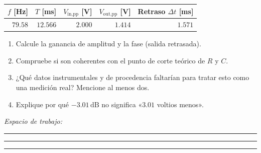 \documentclass[11pt, a4paper]{article}
\begin{document}
\vspace{0.15cm}
\begin{center}
\renewcommand{\arraystretch}{1.3}
\begin{tabular}{rrrrr}
\toprule
\textbf{$f$ [Hz]} & \textbf{$T$ [ms]} & \textbf{$V_{\text{in,pp}}$ [V]} & \textbf{$V_{\text{out,pp}}$ [V]} & \textbf{Retraso $\Delta t$ [ms]} \\
\midrule
$79.58$ & $12.566$ & $2.000$ & $1.414$ & $1.571$ \\
\bottomrule
\end{tabular}
\end{center}

\begin{enumerate}\setlength\itemsep{0.15cm}
    \item[(a)] Calcule la ganancia de amplitud y la fase (salida retrasada).
    \item[(b)] Compruebe si son coherentes con el punto de corte teórico de $R$ y $C$.
    \item[(c)] ¿Qué datos instrumentales y de procedencia faltarían para tratar esto como una medición real? Mencione al menos dos.
    \item[(d)] Explique por qué $-3.01\,\text{dB}$ no significa «$3.01$ voltios menos».
\end{enumerate}
\noindent\textit{Espacio de trabajo:}\par\vspace{0.35cm}
\noindent\rule{\textwidth}{0.3pt}\par\vspace{0.45cm}
\noindent\rule{\textwidth}{0.3pt}\par\vspace{0.45cm}
\noindent\rule{\textwidth}{0.3pt}
\end{document}
